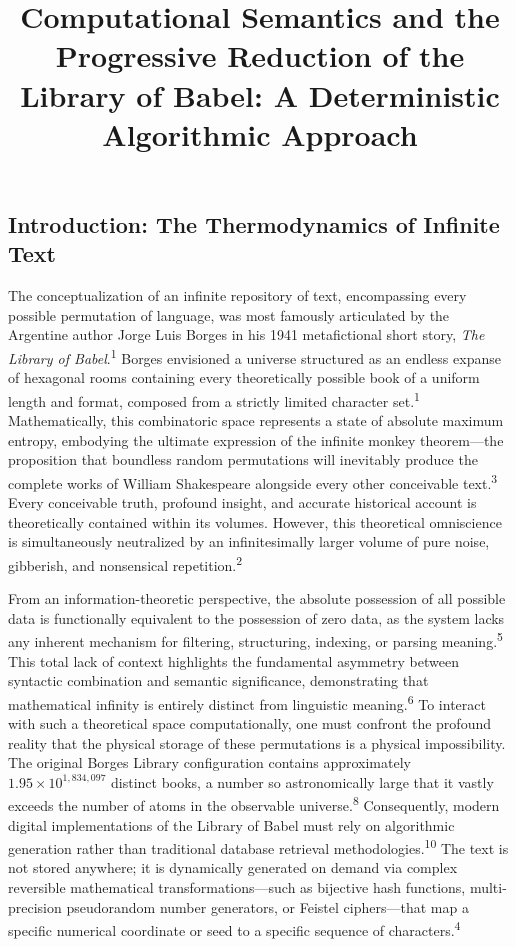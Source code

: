 \documentclass[
  11pt,
  a4paper,
]{article}
\title{Computational Semantics and the Progressive Reduction of the Library of Babel: A Deterministic Algorithmic Approach}
\author{}
\date{}
\begin{document}
\maketitle

{
\hypersetup{linkcolor=}
\setcounter{tocdepth}{3}
\tableofcontents
}
\subsection{Introduction: The Thermodynamics of Infinite Text}\label{introduction-the-thermodynamics-of-infinite-text}

The conceptualization of an infinite repository of text, encompassing every possible permutation of language, was most famously articulated by the Argentine author Jorge Luis Borges in his 1941 metafictional short story, \emph{The Library of Babel}.\textsuperscript{1} Borges envisioned a universe structured as an endless expanse of hexagonal rooms containing every theoretically possible book of a uniform length and format, composed from a strictly limited character set.\textsuperscript{1} Mathematically, this combinatoric space represents a state of absolute maximum entropy, embodying the ultimate expression of the infinite monkey theorem---the proposition that boundless random permutations will inevitably produce the complete works of William Shakespeare alongside every other conceivable text.\textsuperscript{3} Every conceivable truth, profound insight, and accurate historical account is theoretically contained within its volumes. However, this theoretical omniscience is simultaneously neutralized by an infinitesimally larger volume of pure noise, gibberish, and nonsensical repetition.\textsuperscript{2}

From an information-theoretic perspective, the absolute possession of all possible data is functionally equivalent to the possession of zero data, as the system lacks any inherent mechanism for filtering, structuring, indexing, or parsing meaning.\textsuperscript{5} This total lack of context highlights the fundamental asymmetry between syntactic combination and semantic significance, demonstrating that mathematical infinity is entirely distinct from linguistic meaning.\textsuperscript{6} To interact with such a theoretical space computationally, one must confront the profound reality that the physical storage of these permutations is a physical impossibility. The original Borges Library configuration contains approximately \(1.95 \times 10^{1,834,097}\) distinct books, a number so astronomically large that it vastly exceeds the number of atoms in the observable universe.\textsuperscript{8} Consequently, modern digital implementations of the Library of Babel must rely on algorithmic generation rather than traditional database retrieval methodologies.\textsuperscript{10} The text is not stored anywhere; it is dynamically generated on demand via complex reversible mathematical transformations---such as bijective hash functions, multi-precision pseudorandom number generators, or Feistel ciphers---that map a specific numerical coordinate or seed to a specific sequence of characters.\textsuperscript{4}
\end{document}
